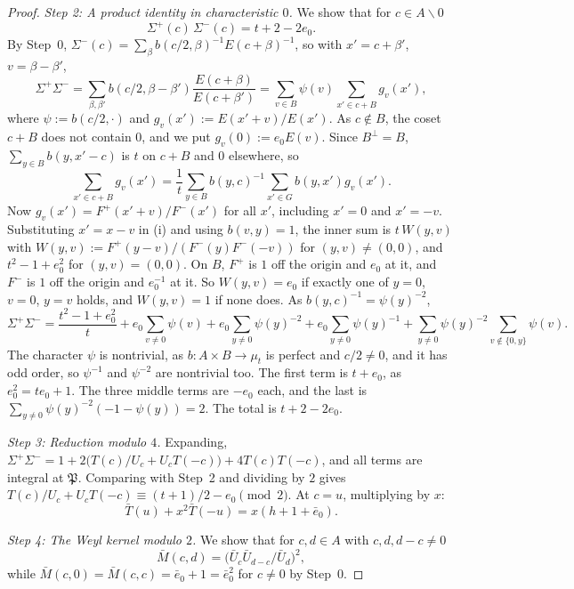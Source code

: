 \documentclass[11pt]{amsart}
\numberwithin{equation}{section}
\theoremstyle{plain}
\theoremstyle{definition}
\theoremstyle{remark}
\begin{document}
\begin{proof}
\emph{Step 2: A product identity in characteristic \(0\).} We show that for \(c\in A\smallsetminus0\)
\[\Sigma^+(c)\,\Sigma^-(c)=t+2-2e_0 .\]
By Step~0, \(\Sigma^-(c)=\sum_{\beta}b(c/2,\beta)^{-1}E(c+\beta)^{-1}\), so with \(x'=c+\beta'\), \(v=\beta-\beta'\),
\[\Sigma^+\Sigma^-=\sum_{\beta,\beta'}b(c/2,\beta-\beta')\frac{E(c+\beta)}{E(c+\beta')}=\sum_{v\in B}\psi(v)\sum_{x'\in c+B}g_v(x'),\]
where \(\psi:=b(c/2,\cdot)\) and \(g_v(x'):=E(x'+v)/E(x')\). As \(c\notin B\), the coset \(c+B\) does not contain \(0\), and we put \(g_v(0):=e_0E(v)\). Since \(B^\perp=B\), \(\sum_{y\in B}b(y,x'-c)\) is \(t\) on \(c+B\) and \(0\) elsewhere, so
\[\sum_{x'\in c+B}g_v(x')=\frac1t\sum_{y\in B}b(y,c)^{-1}\sum_{x'\in G}b(y,x')g_v(x').\]
Now \(g_v(x')=F^+(x'+v)/F^-(x')\) for all \(x'\), including \(x'=0\) and \(x'=-v\). Substituting \(x'=x-v\) in (i) and using \(b(v,y)=1\), the inner sum is \(t\,W(y,v)\) with \(W(y,v):=F^+(y-v)/(F^-(y)F^-(-v))\) for \((y,v)\ne(0,0)\), and \(t^2-1+e_0^2\) for \((y,v)=(0,0)\). On \(B\), \(F^+\) is \(1\) off the origin and \(e_0\) at it, and \(F^-\) is \(1\) off the origin and \(e_0^{-1}\) at it. So \(W(y,v)=e_0\) if exactly one of \(y=0\), \(v=0\), \(y=v\) holds, and \(W(y,v)=1\) if none does. As \(b(y,c)^{-1}=\psi(y)^{-2}\),
\[\Sigma^+\Sigma^-=\frac{t^2-1+e_0^2}t+e_0\sum_{v\ne0}\psi(v)+e_0\sum_{y\ne0}\psi(y)^{-2}+e_0\sum_{y\ne0}\psi(y)^{-1}+\sum_{y\ne0}\psi(y)^{-2}\sum_{v\notin\{0,y\}}\psi(v).\]
The character \(\psi\) is nontrivial, as \(b:A\times B\to\mu_t\) is perfect and \(c/2\ne0\), and it has odd order, so \(\psi^{-1}\) and \(\psi^{-2}\) are nontrivial too. The first term is \(t+e_0\), as \(e_0^2=te_0+1\). The three middle terms are \(-e_0\) each, and the last is \(\sum_{y\ne0}\psi(y)^{-2}(-1-\psi(y))=2\). The total is \(t+2-2e_0\).

\emph{Step 3: Reduction modulo \(4\).} Expanding, \(\Sigma^+\Sigma^-=1+2\bigl(T(c)/U_c+U_cT(-c)\bigr)+4T(c)T(-c)\), and all terms are integral at \(\mathfrak P\). Comparing with Step~2 and dividing by \(2\) gives \(T(c)/U_c+U_cT(-c)\equiv(t+1)/2-e_0\pmod2\). At \(c=u\), multiplying by \(x\):
\[\bar T(u)+x^2\bar T(-u)=x(h+1+\bar e_0).\tag{\(\alpha\)}\]

\emph{Step 4: The Weyl kernel modulo \(2\).} We show that for \(c,d\in A\) with \(c,d,d-c\ne0\)
\[\bar M(c,d)=\bigl(\bar U_c\bar U_{d-c}/\bar U_d\bigr)^2,\]
while \(\bar M(c,0)=\bar M(c,c)=\bar e_0+1=\bar e_0^2\) for \(c\ne0\) by Step~0.


\end{proof}
\end{document}
